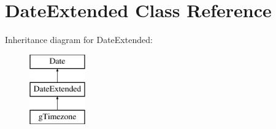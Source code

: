 \hypertarget{class_date_extended}{\section{Date\-Extended Class Reference}
\label{class_date_extended}
}
Inheritance diagram for Date\-Extended\-:\begin{figure}[H]
\begin{center}
\leavevmode
\includegraphics[height=3.000000cm]{class_date_extended}
\end{center}
\end{figure}
